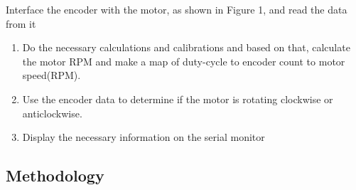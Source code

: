 \documentclass[12pt]{article}
\begin{document}
Interface the encoder with the motor, as shown in Figure 1, and read the data from it
\begin{enumerate}
    \item Do the necessary calculations and calibrations and based on that, calculate the motor RPM and make a map of duty-cycle to encoder count to motor speed(RPM).
    \item Use the encoder data to determine if the motor is rotating clockwise or anticlockwise.
    \item Display the necessary information on the serial monitor
\end{enumerate}

\subsection{Methodology}
\end{document}
